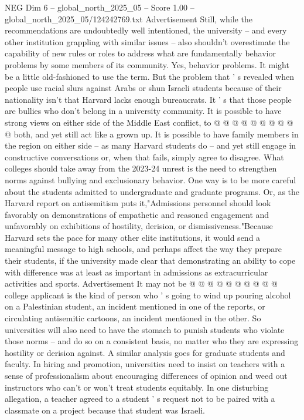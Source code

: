 \begin{textsample}{NEG Dim 6 – global\_north\_2025\_05 – Score 1.00 – global\_north\_2025\_05/124242769.txt}
Advertisement Still, while the recommendations are undoubtedly well intentioned, the university -- and every other institution grappling with similar issues -- also shouldn't overestimate the capability of new rules or roles to address what are fundamentally behavior problems by some members of its community.
Yes, behavior problems.
It might be a little old-fashioned to use the term.
But the problem that ' s revealed when people use racial slurs against Arabs or shun Israeli students because of their nationality isn't that Harvard lacks enough bureaucrats.
It ' s that those people are bullies who don't belong in a university community.
It is possible to have strong views on either side of the Middle East conflict, to @ @ @ @ @ @ @ @ @ @ both, and yet still act like a grown up.
It is possible to have family members in the region on either side -- as many Harvard students do -- and yet still engage in constructive conversations or, when that fails, simply agree to disagree.
What colleges should take away from the 2023-24 unrest is the need to strengthen norms against bullying and exclusionary behavior.
One way is to be more careful about the students admitted to undergraduate and graduate programs.
Or, as the Harvard report on antisemitism puts it,"Admissions personnel should look favorably on demonstrations of empathetic and reasoned engagement and unfavorably on exhibitions of hostility, derision, or dismissiveness."Because Harvard sets the pace for many other elite institutions, it would send a meaningful message to high schools, and perhaps affect the way they prepare their students, if the university made clear that demonstrating an ability to cope with difference was at least as important in admissions as extracurricular activities and sports.
Advertisement It may not be @ @ @ @ @ @ @ @ @ @ college applicant is the kind of person who ' s going to wind up pouring alcohol on a Palestinian student, an incident mentioned in one of the reports, or circulating antisemitic cartoons, an incident mentioned in the other.
So universities will also need to have the stomach to punish students who violate those norms -- and do so on a consistent basis, no matter who they are expressing hostility or derision against.
A similar analysis goes for graduate students and faculty.
In hiring and promotion, universities need to insist on teachers with a sense of professionalism about encouraging differences of opinion and weed out instructors who can't or won't treat students equitably.
In one disturbing allegation, a teacher agreed to a student ' s request not to be paired with a classmate on a project because that student was Israeli.

\end{textsample}

